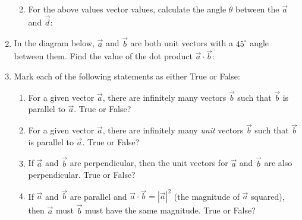 \documentclass[12pt, twoside]{article}
\begin{document}
\begin{enumerate}[itemsep=6cm]
\begin{enumerate}
        \vspace{3cm}
        
        \item For the above values vector values, calculate the angle $\theta$ between the $\vec{a}$ and $\vec{d}$:
        
    \end{enumerate}
    
    \newpage

    \item In the diagram below, $\vec{a}$ and $\vec{b}$ are both unit vectors with a $45^\circ$ angle between them. Find the value of the dot product $\vec{a} \cdot \vec{b}$:
    
    \begin{center}
    \end{center}
    
    \newpage
    
    \item Mark each of the following statements as either True or False:
    
    \begin{enumerate}[itemsep=1cm]
        \item For a given vector $\vec{a}$, there are infinitely many vectors $\vec{b}$ such that $\vec{b}$ is parallel to $\vec{a}$. True or False?
        
        \item For a given vector $\vec{a}$, there are infinitely many \emph{unit} vectors $\vec{b}$ such that $\vec{b}$ is parallel to $\vec{a}$. True or False?
        
        \item If $\vec{a}$ and $\vec{b}$ are perpendicular, then the unit vectors for $\vec{a}$ and $\vec{b}$ are also perpendicular. True or False?
        
        \item If $\vec{a}$ and $\vec{b}$ are parallel and $\vec{a} \cdot \vec{b} = |\vec{a}|^2$ (the magnitude of $\vec{a}$ squared), then $\vec{a}$ must $\vec{b}$ must have the same magnitude. True or False?
        

\end{enumerate}
\end{enumerate}
\end{document}
